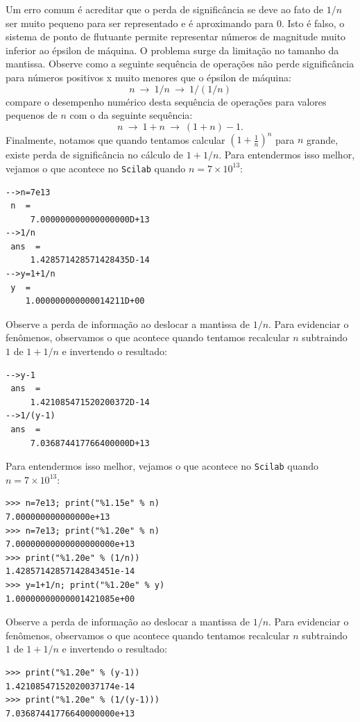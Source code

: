 \begin{ex}
Um erro comum é acreditar que o perda de significância se deve ao fato de $1/n$ ser muito pequeno para ser representado e é aproximando para $0$. Isto é falso, o sistema de ponto de flutuante permite representar números de magnitude muito inferior ao épsilon de máquina. O problema surge da limitação no tamanho da mantissa. Observe como a seguinte sequência de operações não perde significância para números positivos x muito menores que o épsilon de máquina:
\begin{equation}\label{seq_oper2}
n ~\to ~1/n ~\to ~1/(1/n) 
\end{equation}
compare o desempenho numérico desta sequência de operações para valores pequenos de $n$ com o da seguinte sequência:
\begin{equation}\label{seq_oper3}
n ~\to ~1+n ~\to ~(1+n)-1.
\end{equation}
Finalmente, notamos que quando tentamos calcular $\left(1+\frac{1}{n}\right)^n$ para $n$ grande, existe perda de significância no cálculo de $1+1/n$. 
\ifisscilab
Para entendermos isso melhor, vejamos o que acontece no \verb+Scilab+ quando $n=7\times 10^{13}$:
\begin{verbatim}
-->n=7e13
 n  =
     7.000000000000000000D+13  
-->1/n
 ans  =
     1.428571428571428435D-14   
-->y=1+1/n
 y  =
    1.000000000000014211D+00  
\end{verbatim}
Observe a perda de informação ao deslocar a mantissa de $1/n$. Para evidenciar o fenômenos, observamos o que acontece quando tentamos recalcular $n$ subtraindo $1$ de $1+1/n$ e invertendo o resultado:
\begin{verbatim}
-->y-1
 ans  =
     1.421085471520200372D-14   
-->1/(y-1)
 ans  =
     7.036874417766400000D+13  
\end{verbatim}
\fi
\ifisscilab
Para entendermos isso melhor, vejamos o que acontece no \verb+Scilab+ quando $n=7\times 10^{13}$:
\begin{verbatim}
>>> n=7e13; print("%1.15e" % n)
7.000000000000000e+13
>>> n=7e13; print("%1.20e" % n)
7.00000000000000000000e+13
>>> print("%1.20e" % (1/n))
1.42857142857142843451e-14
>>> y=1+1/n; print("%1.20e" % y)
1.00000000000001421085e+00
\end{verbatim}
Observe a perda de informação ao deslocar a mantissa de $1/n$. Para evidenciar o fenômenos, observamos o que acontece quando tentamos recalcular $n$ subtraindo $1$ de $1+1/n$ e invertendo o resultado:
\begin{verbatim}
>>> print("%1.20e" % (y-1))
1.42108547152020037174e-14
>>> print("%1.20e" % (1/(y-1)))
7.03687441776640000000e+13
\end{verbatim}
\fi
\end{ex}

